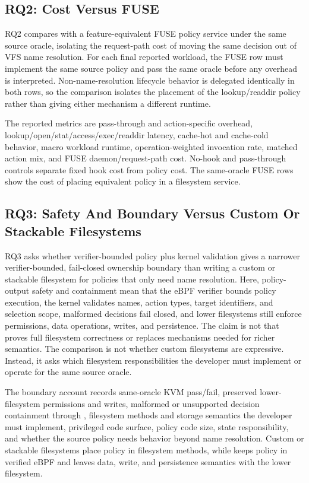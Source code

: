\subsection{RQ2: Cost Versus FUSE}

RQ2 compares \namei with a feature-equivalent FUSE policy service under the same
source oracle, isolating the request-path cost of moving the same decision out
of VFS name resolution. For each final reported workload, the FUSE row must
implement the same source policy and pass the same oracle before any overhead
is interpreted. Non-name-resolution lifecycle
behavior is delegated identically in both rows, so the comparison isolates the
placement of the lookup/readdir policy rather than giving either mechanism a
different runtime.

The reported metrics are pass-through and action-specific \namei overhead,
lookup/open/stat/access/exec/readdir latency, cache-hot and cache-cold behavior,
macro workload runtime, operation-weighted invocation rate, matched action mix,
and FUSE daemon/request-path cost. No-hook and pass-through controls separate
fixed hook cost from policy cost. The same-oracle FUSE rows show the cost of
placing equivalent policy in a filesystem service.

\subsection{RQ3: Safety And Boundary Versus Custom Or Stackable Filesystems}

RQ3 asks whether verifier-bounded policy plus kernel validation gives \namei a
narrower verifier-bounded, fail-closed ownership boundary than writing a custom
or stackable filesystem for policies that only need name resolution. Here,
policy-output safety and containment mean that the eBPF verifier bounds policy
execution, the kernel validates names, action types, target identifiers, and
selection scope, malformed decisions fail closed, and lower filesystems still
enforce permissions, data operations, writes, and persistence. The claim is not
that \namei proves full filesystem correctness or replaces mechanisms needed
for richer semantics. The comparison is not whether custom filesystems are
expressive. Instead, it asks which filesystem responsibilities the developer
must implement or operate for the same source oracle.

The boundary account records same-oracle KVM pass/fail, preserved
lower-filesystem permissions and writes, malformed or unsupported decision
containment through , filesystem methods and storage
semantics the developer must implement, privileged code surface, policy code
size, state responsibility, and whether the source policy needs behavior beyond
name resolution. Custom or stackable filesystems place policy in filesystem
methods, while \namei keeps policy in verified eBPF and leaves data, write, and
persistence semantics with the lower filesystem.

